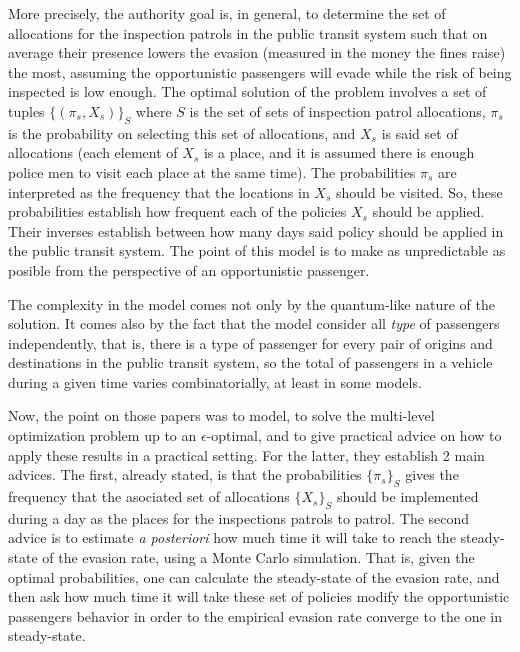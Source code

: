 \documentclass[10pt,letterpaper]{article}
\begin{document}
More precisely, the authority goal is, in general, to determine the set of allocations for the inspection patrols in the public transit system such that on average their presence lowers the evasion (measured in the money the fines raise) the most, assuming the opportunistic passengers will evade while the risk of being inspected is low enough. The optimal solution of the problem involves a set of tuples $\{(\pi_s, X_s)\}_S$ where $S$ is the set of sets of inspection patrol allocations, $\pi_s$ is the probability on selecting this set of allocations, and $X_s$ is said set of allocations (each element of $X_s$ is a place, and it is assumed there is enough police men to visit each place at the same time). The probabilities $\pi_s$ are interpreted as the frequency that the locations in $X_s$ should be visited. So, these probabilities establish how frequent each of the policies $X_s$ should be applied. Their inverses establish between how many days said policy should be applied in the public transit system. The point of this model is to make as unpredictable as posible from the perspective of an opportunistic passenger.\par
The complexity in the model comes not only by the quantum-like nature of the solution. It comes also by the fact that the model consider all \textit{type} of passengers independently, that is, there is a type of passenger for every pair of origins and destinations in the public transit system, so the total of passengers in a vehicle during a given time varies combinatorially, at least in some models.\par
Now, the point on those papers was to model, to solve the multi-level optimization problem up to an $\epsilon$-optimal, and to give practical advice on how to apply these results in a practical setting. For the latter, they establish 2 main advices. The first, already stated, is that the probabilities $\{\pi_s\}_S$ gives the frequency that the asociated set of allocations $\{X_s\}_S$ should be implemented during a day as the places for the inspections patrols to patrol. The second advice is to estimate \textit{a posteriori} how much time it will take to reach the steady-state of the evasion rate, using a Monte Carlo simulation. That is, given the optimal probabilities, one can calculate the steady-state of the evasion rate, and then ask how much time it will take these set of policies modify the opportunistic passengers behavior in order to the empirical evasion rate converge to the one in steady-state.\par
\end{document}
